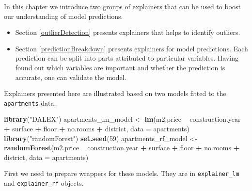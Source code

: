 \documentclass[]{book}
\newenvironment{Shaded}{\begin{snugshade}}{\end{snugshade}}
\newcommand{\DataTypeTok}[1]{\textcolor[rgb]{0.13,0.29,0.53}{#1}}
\newcommand{\DecValTok}[1]{\textcolor[rgb]{0.00,0.00,0.81}{#1}}
\newcommand{\KeywordTok}[1]{\textcolor[rgb]{0.13,0.29,0.53}{\textbf{#1}}}
\newcommand{\NormalTok}[1]{#1}
\newcommand{\OperatorTok}[1]{\textcolor[rgb]{0.81,0.36,0.00}{\textbf{#1}}}
\newcommand{\StringTok}[1]{\textcolor[rgb]{0.31,0.60,0.02}{#1}}
\providecommand{\tightlist}{%
  \setlength{\itemsep}{0pt}\setlength{\parskip}{0pt}}
\theoremstyle{definition}
\theoremstyle{definition}
\theoremstyle{definition}
\theoremstyle{remark}
\begin{document}
In this chapter we introduce two groups of explainers that can be used
to boost our understanding of model predictions.

\begin{itemize}
\tightlist
\item
  Section \ref{outlierDetection} presents explainers that helps to
  identify outliers.
\item
  Section \ref{predictionBreakdown} presents explainers for model
  predictions. Each prediction can be split into parts attributed to
  particular variables. Having found out which variables are important
  and whether the prediction is accurate, one can validate the model.
\end{itemize}

Explainers presented here are illustrated based on two models fitted to
the \texttt{apartments} data.

\begin{Shaded}
\begin{Highlighting}[]
\KeywordTok{library}\NormalTok{(}\StringTok{"DALEX"}\NormalTok{)}
\NormalTok{apartments_lm_model <-}\StringTok{ }\KeywordTok{lm}\NormalTok{(m2.price }\OperatorTok{~}\StringTok{ }\NormalTok{construction.year }\OperatorTok{+}\StringTok{ }\NormalTok{surface }\OperatorTok{+}\StringTok{ }\NormalTok{floor }\OperatorTok{+}\StringTok{ }
\StringTok{                      }\NormalTok{no.rooms }\OperatorTok{+}\StringTok{ }\NormalTok{district, }\DataTypeTok{data =}\NormalTok{ apartments)}
\KeywordTok{library}\NormalTok{(}\StringTok{"randomForest"}\NormalTok{)}
\KeywordTok{set.seed}\NormalTok{(}\DecValTok{59}\NormalTok{)}
\NormalTok{apartments_rf_model <-}\StringTok{ }\KeywordTok{randomForest}\NormalTok{(m2.price }\OperatorTok{~}\StringTok{ }\NormalTok{construction.year }\OperatorTok{+}\StringTok{ }\NormalTok{surface }\OperatorTok{+}\StringTok{ }\NormalTok{floor }\OperatorTok{+}\StringTok{ }
\StringTok{                      }\NormalTok{no.rooms }\OperatorTok{+}\StringTok{ }\NormalTok{district, }\DataTypeTok{data =}\NormalTok{ apartments)}
\end{Highlighting}
\end{Shaded}

First we need to prepare wrappers for these models. They are in
\texttt{explainer\_lm} and \texttt{explainer\_rf} objects.

\begin{Shaded}
\end{Shaded}
\end{document}
